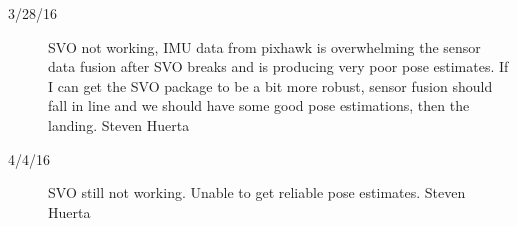 \begin{description}
\item [3/28/16]  SVO not working, IMU data from pixhawk is overwhelming the sensor data fusion after SVO breaks and is producing very poor pose estimates. If I can get the SVO package to be a bit more robust, sensor fusion should fall in line and we should have some good pose estimations, then the landing. \hfill{Steven Huerta}

\item [4/4/16]  SVO still not working. Unable to get reliable pose estimates.  \hfill{Steven Huerta}
\end{description}